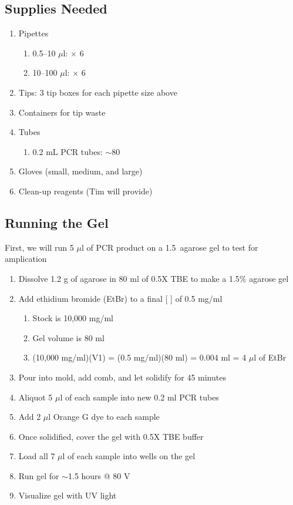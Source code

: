 \documentclass[12pt, hidelinks]{article}
\begin{document}
	\subsection{Supplies Needed}
		\begin{enumerate}
			\item Pipettes
				\begin{enumerate}
					\item 0.5--10 $\mu$l: $\times$ 6
					\item 10--100 $\mu$l: $\times$ 6
				\end{enumerate}
			\item Tips: 3 tip boxes for each pipette size above	
			\item Containers for tip waste
			\item Tubes
				\begin{enumerate}
					\item 0.2 mL PCR tubes: $\sim$80
				\end{enumerate}	
			\item Gloves (small, medium, and large)
			\item Clean-up reagents (Tim will provide)
	\end{enumerate}	
	
	
	\subsection{Running the Gel}	
	First, we will run 5 $\mu$l of PCR product on a 1.5\ agarose gel to test for amplication
	
		\begin{enumerate}
			\item Dissolve 1.2 g of agarose in 80 ml of 0.5X TBE to make a 1.5\% agarose gel
			\item Add ethidium bromide (EtBr) to a final [ ] of 0.5 mg/ml
				\begin{enumerate}
					\item Stock is 10,000 mg/ml
					\item Gel volume is 80 ml
					\item (10,000 mg/ml)(V1) = (0.5 mg/ml)(80 ml) = 0.004 ml = 4 $\mu$l of EtBr
				\end{enumerate}
			\item Pour into mold, add comb, and let solidify for 45 minutes
			\item Aliquot 5 $\mu$l of each sample into new 0.2 ml PCR tubes
			\item Add 2 $\mu$l Orange G dye to each sample
			\item Once solidified, cover the gel with 0.5X TBE buffer
			\item Load all 7 $\mu$l of each sample into wells on the gel
			\item Run gel for $\sim$1.5 hours @ 80 V
			\item Visualize gel with UV light
		\end{enumerate}
	
\end{document}
